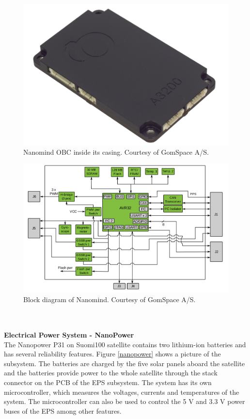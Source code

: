 \documentclass[english,12pt,a4paper,pdftex,elec,utf8]{aaltothesis}
\begin{document}
\begin{figure}[h!]
\centering
\includegraphics[scale=0.2]{nanomind}
\caption{Nanomind OBC inside its casing. Courtesy of GomSpace A/S. \cite{nanomindds}}
\label{nanomind}
\end{figure}
\begin{figure}[h!]
\centering
\includegraphics[scale=0.4]{nanomind_block}
\caption{Block diagram of Nanomind. Courtesy of GomSpace A/S. \cite{nanomindds}}
\label{nanomindblock}
\end{figure}
\\
\\
\textbf{Electrical Power System - NanoPower}\\
The Nanopower P31 on Suomi100 satellite contains two lithium-ion batteries and has several reliability features. Figure \ref{nanopower} shows a picture of the subsystem. The batteries are charged by the five solar panels aboard the satellite and the batteries provide power to the whole satellite through the stack connector on the PCB of the EPS subsystem. The system has its own microcontroller, which measures the voltages, currents and temperatures of the system. The microcontroller can also be used to control the 5 V and 3.3 V power buses of the EPS among other features. \cite{nanopowerds}\\
\end{document}

